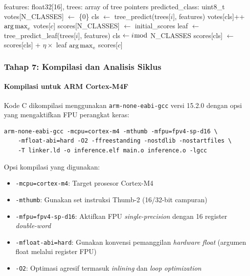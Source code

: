\begin{algorithm}[htbp]
\caption{Inferensi Ensemble (Varian Voting dan Scoring)}
\label{alg:arm_ensemble}
\begin{algorithmic}[1]
\REQUIRE features: float32[16], trees: array of tree pointers
\ENSURE predicted\_class: uint8\_t
    \STATE votes[N\_CLASSES] $\leftarrow$ \{0\}
        \STATE cls $\leftarrow$ tree\_predict(trees[$i$], features)
        \STATE votes[cls]++
    \ENDFOR
    \RETURN $\operatorname*{arg\,max}_{c}$ votes[$c$]
\ELSE
    \STATE {}
    \STATE scores[N\_CLASSES] $\leftarrow$ initial\_scores
        \STATE leaf $\leftarrow$ tree\_predict\_leaf(trees[$i$], features)
        \STATE cls $\leftarrow i \bmod$ N\_CLASSES
        \STATE scores[cls] $\leftarrow$ scores[cls] + $\eta \times$ leaf
    \ENDFOR
    \RETURN $\operatorname*{arg\,max}_{c}$ scores[$c$]
\ENDIF
\end{algorithmic}
\end{algorithm}

\subsubsection{Tahap 7: Kompilasi dan Analisis Siklus}

\paragraph{Kompilasi untuk ARM Cortex-M4F}
Kode C dikompilasi menggunakan \texttt{arm-none-eabi-gcc} versi 15.2.0 dengan opsi yang mengaktifkan FPU perangkat keras:

\begin{verbatim}
arm-none-eabi-gcc -mcpu=cortex-m4 -mthumb -mfpu=fpv4-sp-d16 \
    -mfloat-abi=hard -O2 -ffreestanding -nostdlib -nostartfiles \
    -T linker.ld -o inference.elf main.o inference.o -lgcc
\end{verbatim}

Opsi kompilasi yang digunakan:
\begin{itemize}
    \item \texttt{-mcpu=cortex-m4}: Target prosesor Cortex-M4
    \item \texttt{-mthumb}: Gunakan set instruksi Thumb-2 (16/32-bit campuran)
    \item \texttt{-mfpu=fpv4-sp-d16}: Aktifkan FPU \textit{single-precision} dengan 16 register \textit{double-word}
    \item \texttt{-mfloat-abi=hard}: Gunakan konvensi pemanggilan \textit{hardware float} (argumen float melalui register FPU)
    \item \texttt{-O2}: Optimasi agresif termasuk \textit{inlining} dan \textit{loop optimization}
\end{itemize}

